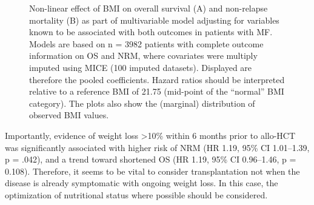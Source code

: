 \documentclass[
  letterpaper,
  DIV=11,
  numbers=noendperiod]{scrreprt}
\begin{document}
\begin{figure}


\caption{\label{fig-polv-one}Non-linear effect of BMI on overall
survival (A) and non-relapse mortality (B) as part of multivariable
model adjusting for variables known to be associated with both outcomes
in patients with MF. Models are based on n = 3982 patients with complete
outcome information on OS and NRM, where covariates were multiply
imputed using MICE (100 imputed datasets). Displayed are therefore the
pooled coefficients. Hazard ratios should be interpreted relative to a
reference BMI of 21.75 (mid-point of the ``normal'' BMI category). The
plots also show the (marginal) distribution of observed BMI values.}

\end{figure}%

Importantly, evidence of weight loss \textgreater10\% within 6 months
prior to allo-HCT was significantly associated with higher risk of NRM
(HR 1.19, 95\% CI 1.01--1.39, p = .042), and a trend toward shortened OS
(HR 1.19, 95\% CI 0.96--1.46, p = 0.108). Therefore, it seems to be
vital to consider transplantation not when the disease is already
symptomatic with ongoing weight loss. In this case, the optimization of
nutritional status where possible should be considered.
\end{document}
